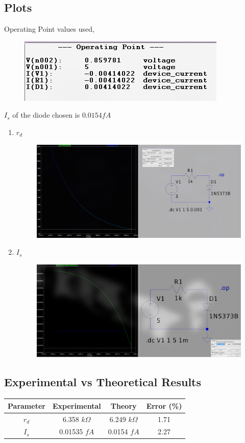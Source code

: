 \documentclass{article}
\begin{document}
\subsection{Plots}
Operating Point values used,
\begin{figure}[h!]
        \centering
        \includegraphics[width=0.7\linewidth]{figs/diode_op.png}
    \end{figure}
    \newline
$I_s$ of the diode chosen is $0.0154 fA$
\begin{enumerate}
    \item $r_d$ \begin{figure}[h!]
        \centering
        \includegraphics[width=0.9\linewidth]{figs/diode_rd.png}
    \end{figure}
    \item $I_s$ \begin{figure}[h!]
        \centering
        \includegraphics[width=0.9\linewidth]{figs/diode_is.png}
    \end{figure}
\end{enumerate}
\subsection*{Experimental vs Theoretical Results}
\begin{center}
\begin{tabular}{|c|c|c|c|}
\hline
Parameter & Experimental & Theory & Error (\%) \\
\hline
$r_d$ & 6.358 $k\Omega$ & 6.249 $k\Omega$  & 1.71 \\
$I_s$ & 0.01535 $fA$ & 0.0154 $fA$ & 2.27 \\
\hline
\end{tabular}
\end{center}
\pagebreak
\end{document}
